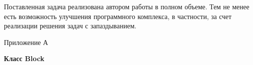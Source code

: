 \documentclass[a4paper, 14pt]{extarticle}
\theoremstyle{definition}
\begin{document}
\par Поставленная задача реализована автором работы в полном объеме. Тем не менее есть возможность улучшения программного комплекса, в частности, за счет реализации решения задач с запаздыванием.






%
%
%
%
%

\newpage
{}





\newpage

\begin{flushright}
Приложение А
\end{flushright}

\begin{center}
\textbf{Класс Block}
\end{center}
\end{document}
